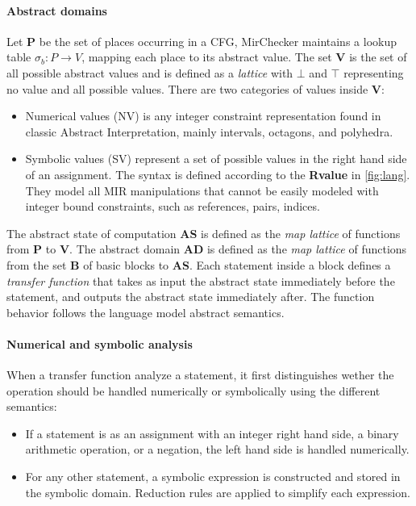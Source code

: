 \documentclass{article}
\begin{document}
\paragraph{Abstract domains}
Let \textbf{P} be the set of places  occurring in a CFG, MirChecker maintains a lookup table $\sigma_b : P \rightarrow V$, mapping each place 
to its abstract value. The set \textbf{V} is the set of all possible abstract values and is defined as a 
\textit{lattice} with $\bot$ and $\top$ representing no value and all possible values. There are two categories of values inside \textbf{V}: 
\begin{itemize}
    \item Numerical values (NV) is any integer constraint representation found in 
    classic Abstract Interpretation, mainly intervals, octagons, and polyhedra.
    \item Symbolic values (SV) represent a set of possible values in the right hand side of an assignment. The syntax is defined
    according to the \textbf{Rvalue} in \autoref{fig:lang}. They model  all MIR manipulations that cannot be easily modeled 
    with integer bound constraints, such as references, pairs, indices.
\end{itemize}

The abstract state of computation \textbf{AS} is defined as the \textit{map lattice} of functions from 
\textbf{P} to \textbf{V}. The abstract domain \textbf{AD} is defined as the \textit{map lattice} of functions from the set \textbf{B} of basic blocks to 
\textbf{AS}. Each statement inside a block defines a \textit{transfer function}
that takes as input the abstract state  immediately before the statement, and outputs the abstract state immediately after. The function behavior follows 
the language model abstract semantics.
\paragraph{Numerical and symbolic analysis}
When a transfer function analyze a statement, it first distinguishes wether the operation should be handled numerically or symbolically  using the different semantics:
\begin{itemize}
    \item If a statement is as an assignment with an integer right hand side, a binary arithmetic operation, or a negation, the left 
    hand side is handled numerically.
    \item For any other statement, a symbolic expression is constructed and stored in the symbolic domain. Reduction rules are applied 
    to simplify each expression.
\end{itemize}
\end{document}
